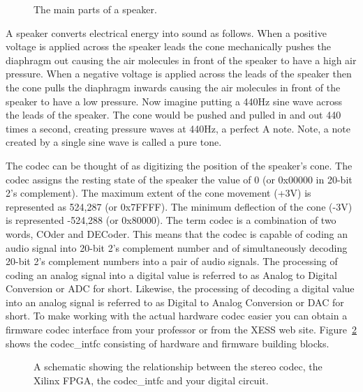 \begin{enumerate}
\begin{figure}[ht]
\caption{The main parts of a speaker.}
\label{fig:speaker}
\end{figure}


A speaker converts electrical energy into sound as follows.  When a positive 
voltage is applied across the speaker leads the cone mechanically pushes 
the diaphragm out causing the air molecules in front of the  speaker to 
have a high air pressure.  When a negative voltage is 
applied across the leads of the speaker then the cone pulls the diaphragm 
inwards causing the air molecules in front of the speaker to have a low 
pressure.  Now imagine putting a 440Hz
sine wave across the leads of the speaker. The cone would be pushed and 
pulled in and out 440 times a second, creating pressure waves at 440Hz,
a perfect A note.  Note, a note created by a single sine wave is called 
a pure tone.

The codec can be thought of as digitizing the position of the speaker's
cone.  The codec assigns the resting state of the speaker the value
of 0 (or 0x00000 in 20-bit 2's complement).  The maximum extent of the cone
movement (+3V) is represented as 524,287 (or 0x7FFFF).  The minimum deflection of 
the cone (-3V) is represented -524,288 (or 0x80000).  
 The term codec is a combination of two words, COder
and DECoder.  This means that the codec is capable of coding an audio signal
into 20-bit 2's complement number and of simultaneously decoding 20-bit 2's
complement numbers into a pair of audio signals.   The processing of coding an analog
signal into a digital value is referred to as Analog to Digital Conversion or
ADC for short.  Likewise, the processing of decoding a digital value into an
analog signal is referred to as Digital to Analog Conversion or DAC for short.
To make working with the actual hardware codec easier you can obtain a firmware 
codec interface from your professor or from the XESS web site.  Figure~\ref{fig:codec} 
shows the codec\_intfc consisting of hardware and firmware 
building blocks. 

\begin{figure}[ht]
\caption{A schematic showing the relationship between the stereo codec,
the Xilinx FPGA, the codec\_intfc and your digital circuit.}
\label{fig:codec}
\end{figure}



\end{enumerate}
